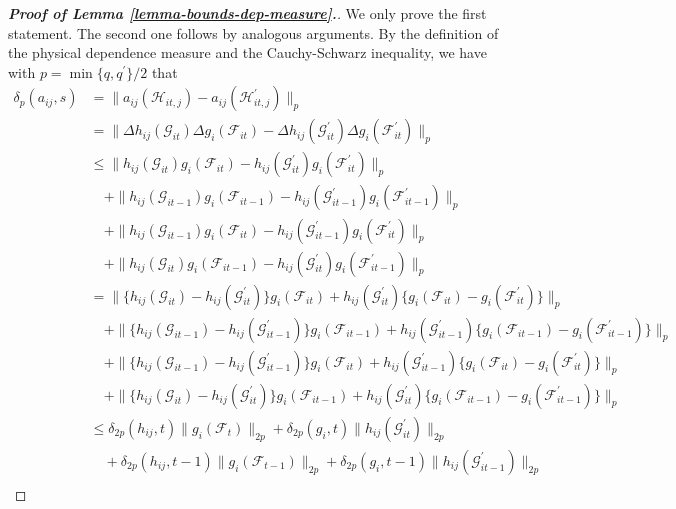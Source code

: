 \documentclass[12pt]{article}
\begin{document}
\begin{proof}[\textnormal{\textbf{Proof of Lemma \ref{lemma-bounds-dep-measure}.}}]
We only prove the first statement. The second one follows by analogous arguments. By the definition of the physical dependence measure and the Cauchy-Schwarz inequality, we have with $p = \min\{q,q^\prime\}/2$ that
\begin{align*}
\delta_p(a_{ij}, s) 
 & = \| a_{ij}(\mathcal{H}_{it,j}) - a_{ij}(\mathcal{H}_{it,j}^\prime) \|_p \\
 &= \| \Delta h_{ij}(\mathcal{G}_{it}) \Delta g_i(\mathcal{F}_{it}) -  \Delta h_{ij}(\mathcal{G}_{it}^\prime) \Delta g_i(\mathcal{F}_{it}^\prime) \|_p \\
 &\leq \| h_{ij}(\mathcal{G}_{it}) g_i(\mathcal{F}_{it}) - h_{ij}(\mathcal{G}_{it}^\prime) g_i(\mathcal{F}_{it}^\prime) \|_p \\
 &\quad + \| h_{ij}(\mathcal{G}_{it-1}) g_i(\mathcal{F}_{it-1}) - h_{ij}(\mathcal{G}_{it-1}^\prime) g_i(\mathcal{F}_{it-1}^\prime) \|_p \\
 &\quad + \| h_{ij}(\mathcal{G}_{it-1}) g_i(\mathcal{F}_{it}) - h_{ij}(\mathcal{G}_{it-1}^\prime) g_i(\mathcal{F}_{it}^\prime) \|_p \\
 &\quad + \| h_{ij}(\mathcal{G}_{it}) g_i(\mathcal{F}_{it-1}) - h_{ij}(\mathcal{G}_{it}^\prime) g_i(\mathcal{F}_{it-1}^\prime) \|_p \\
 & = \| \{ h_{ij}(\mathcal{G}_{it}) - h_{ij}(\mathcal{G}_{it}^\prime)\} g_i(\mathcal{F}_{it}) + h_{ij}(\mathcal{G}_{it}^\prime) \{g_i(\mathcal{F}_{it}) - g_i(\mathcal{F}_{it}^\prime)\} \|_p \\
 & \quad + \| \{ h_{ij}(\mathcal{G}_{it-1}) - h_{ij}(\mathcal{G}_{it-1}^\prime)\} g_i(\mathcal{F}_{it-1}) + h_{ij}(\mathcal{G}_{it-1}^\prime) \{g_i(\mathcal{F}_{it-1}) - g_i(\mathcal{F}_{it-1}^\prime)\} \|_p \\
 &\quad + \| \{ h_{ij}(\mathcal{G}_{it-1}) - h_{ij}(\mathcal{G}_{it-1}^\prime)\} g_i(\mathcal{F}_{it}) + h_{ij}(\mathcal{G}_{it-1}^\prime) \{g_i(\mathcal{F}_{it}) - g_i(\mathcal{F}_{it}^\prime)\} \|_p \\
 &\quad + \| \{ h_{ij}(\mathcal{G}_{it}) - h_{ij}(\mathcal{G}_{it}^\prime)\} g_i(\mathcal{F}_{it-1}) + h_{ij}(\mathcal{G}_{it}^\prime) \{g_i(\mathcal{F}_{it-1}) - g_i(\mathcal{F}_{it-1}^\prime)\} \|_p \\
 &\leq \delta_{2p}(h_{ij}, t) \| g_i(\mathcal{F}_t) \|_{2p} + \delta_{2p} (g_i, t) \| h_{ij}(\mathcal{G}_{it}^\prime) \|_{2p} \\
&\quad + \delta_{2p}(h_{ij}, t-1) \| g_i(\mathcal{F}_{t-1}) \|_{2p} + \delta_{2p} (g_i, t-1) \| h_{ij}(\mathcal{G}_{it-1}^\prime) \|_{2p} \\

\end{align*}
\end{proof}
\end{document}
